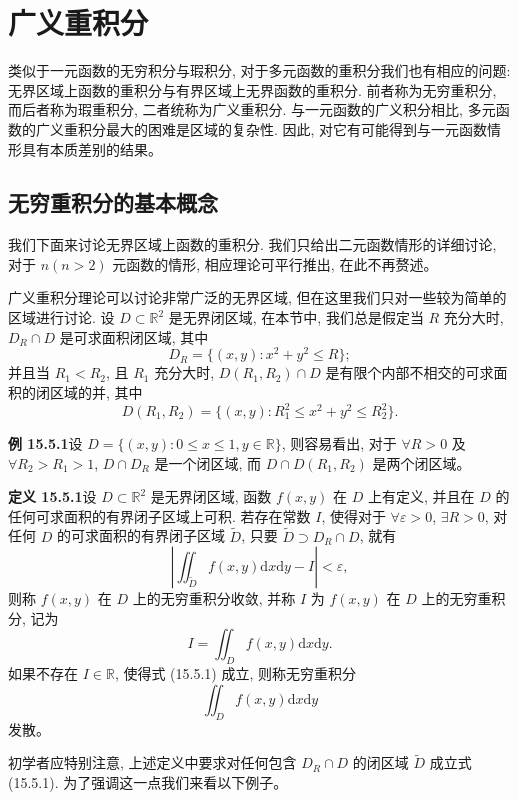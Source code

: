 \documentclass[UTF8,12pt,a4paper,fontset=fandol]{ctexart}
\begin{document}
\section{广义重积分}

类似于一元函数的无穷积分与瑕积分, 对于多元函数的重积分我们也有相应的问题: 无界区域上函数的重积分与有界区域上无界函数的重积分. 前者称为无穷重积分, 而后者称为瑕重积分, 二者统称为广义重积分. 与一元函数的广义积分相比, 多元函数的广义重积分最大的困难是区域的复杂性. 因此, 对它有可能得到与一元函数情形具有本质差别的结果。

\subsection{无穷重积分的基本概念}

我们下面来讨论无界区域上函数的重积分. 我们只给出二元函数情形的详细讨论, 对于 $n(n>2)$ 元函数的情形, 相应理论可平行推出, 在此不再赘述。

广义重积分理论可以讨论非常广泛的无界区域, 但在这里我们只对一些较为简单的区域进行讨论. 设 $D\subset\mathbb R^2$ 是无界闭区域, 在本节中, 我们总是假定当 $R$ 充分大时, $D_R\cap D$ 是可求面积闭区域, 其中
\[
  D_R=\{(x,y):x^2+y^2\leqslant R\};
\]
并且当 $R_1<R_2$, 且 $R_1$ 充分大时, $D(R_1,R_2)\cap D$ 是有限个内部不相交的可求面积的闭区域的并, 其中
\[
  D(R_1,R_2)=\{(x,y):R_1^2\leqslant x^2+y^2\leqslant R_2^2\}.
\]

\noindent\textbf{例 15.5.1}\quad 设 $D=\{(x,y):0\leqslant x\leqslant1,y\in\mathbb R\}$, 则容易看出, 对于 $\forall R>0$ 及 $\forall R_2>R_1>1$, $D\cap D_R$ 是一个闭区域, 而 $D\cap D(R_1,R_2)$ 是两个闭区域。

\noindent\textbf{定义 15.5.1}\quad 设 $D\subset\mathbb R^2$ 是无界闭区域, 函数 $f(x,y)$ 在 $D$ 上有定义, 并且在 $D$ 的任何可求面积的有界闭子区域上可积. 若存在常数 $I$, 使得对于 $\forall\varepsilon>0$, $\exists R>0$, 对任何 $D$ 的可求面积的有界闭子区域 $\widetilde D$, 只要 $\widetilde D\supset D_R\cap D$, 就有
\begin{equation}
  \left|\iint_{\widetilde D}f(x,y)\mathrm dx\mathrm dy-I\right|<\varepsilon,
  \tag{15.5.1}
\end{equation}
则称 $f(x,y)$ 在 $D$ 上的无穷重积分收敛, 并称 $I$ 为 $f(x,y)$ 在 $D$ 上的无穷重积分, 记为
\[
  I=\iint_D f(x,y)\mathrm dx\mathrm dy.
\]
如果不存在 $I\in\mathbb R$, 使得式 (15.5.1) 成立, 则称无穷重积分
\[
  \iint_D f(x,y)\mathrm dx\mathrm dy
\]
发散。

初学者应特别注意, 上述定义中要求对任何包含 $D_R\cap D$ 的闭区域 $\widetilde D$ 成立式 (15.5.1). 为了强调这一点我们来看以下例子。
\end{document}
